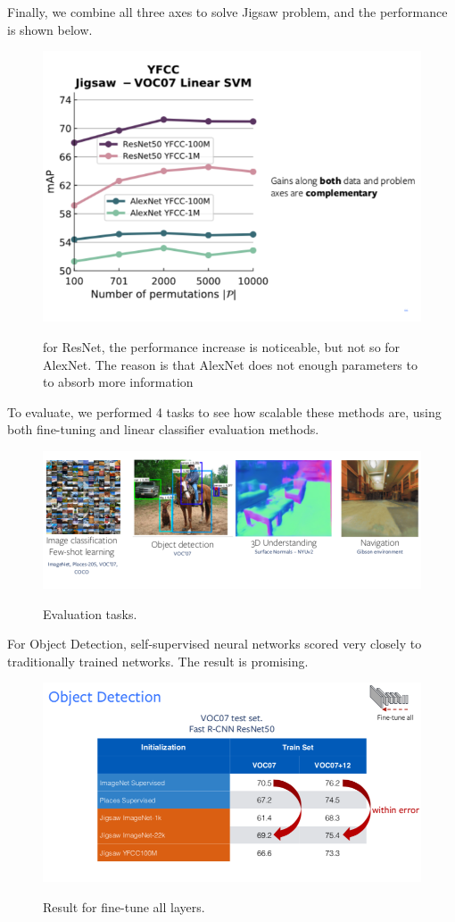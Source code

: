 Finally, we combine all three axes to solve Jigsaw problem, and the performance  is shown below.

\begin{figure}[htb!]
\centering
\includegraphics[width=0.8\linewidth]{lectures/14-b/graphics/combined.png}
\label{fig:combined}
\caption{for ResNet, the performance increase is noticeable, but not so for AlexNet. The reason is that AlexNet does not enough parameters to to absorb more information}
\end{figure}

To evaluate, we performed 4 tasks to see how scalable these methods are, using both fine-tuning and linear classifier evaluation methods.

\begin{figure}[htb!]
\centering
\includegraphics[width=0.8\linewidth]{lectures/14-b/graphics/evaluation.png}
\label{fig:combined}
\caption{Evaluation tasks.}
\end{figure}

For Object Detection, self-supervised neural networks scored very closely to traditionally trained networks. The result is promising.


\begin{figure}[htb!]
\centering
\includegraphics[width=0.8\linewidth]{lectures/14-b/graphics/od.png}
\label{fig:od}
\caption{Result for fine-tune all layers.}
\end{figure}

